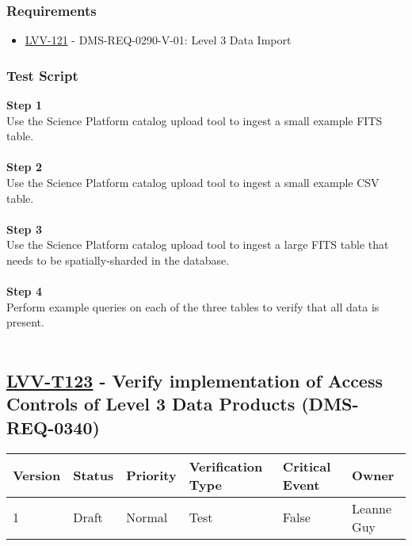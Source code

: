 \hypertarget{requirements-99}{%
\subsubsection{Requirements}\label{requirements-99}}

\begin{itemize}
\tightlist
\item
  \href{https://jira.lsstcorp.org/browse/LVV-121}{LVV-121} -
  DMS-REQ-0290-V-01: Level 3 Data Import
\end{itemize}

\hypertarget{test-script-99}{%
\subsubsection{Test Script}\label{test-script-99}}

\textbf{Step 1}\\
Use the Science Platform catalog upload tool to ingest a small example
FITS table.\\
~\\
\textbf{Step 2}\\
Use the Science Platform catalog upload tool to ingest a small example
CSV table.\\
~\\
\textbf{Step 3}\\
Use the Science Platform catalog upload tool to ingest a large FITS
table that needs to be spatially-sharded in the database.\\
~\\
\textbf{Step 4}\\
Perform example queries on each of the three tables to verify that all
data is present.\\
~\\

\hypertarget{lvv-t123---verify-implementation-of-access-controls-of-level-3-data-products-dms-req-0340}{%
\subsection{\texorpdfstring{\href{https://jira.lsstcorp.org/secure/Tests.jspa\#/testCase/LVV-T123}{LVV-T123}
- Verify implementation of Access Controls of Level 3 Data Products
(DMS-REQ-0340)}{LVV-T123 - Verify implementation of Access Controls of Level 3 Data Products (DMS-REQ-0340)}}\label{lvv-t123---verify-implementation-of-access-controls-of-level-3-data-products-dms-req-0340}}

\begin{longtable}[]{@{}llllll@{}}
\toprule
Version & Status & Priority & Verification Type & Critical Event &
Owner\tabularnewline
\midrule
\endhead
1 & Draft & Normal & Test & False & Leanne Guy\tabularnewline
\bottomrule
\end{longtable}

